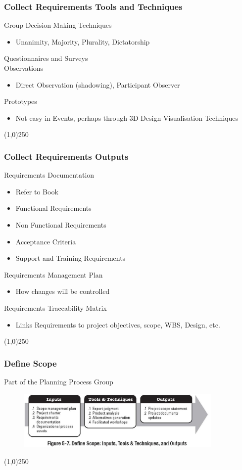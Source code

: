 \begin{frame}
\frametitle{Collect Requirements \hfill Tools and Techniques}
Group Decision Making Techniques
\begin{itemize}
	\item Unanimity, Majority, Plurality, Dictatorship
\end{itemize}
Questionnaires and Surveys\\
Observations
\begin{itemize}
	\item Direct Observation (shadowing), Participant Observer
\end{itemize}
Prototypes
\begin{itemize}
	\item Not easy in Events, perhaps through 3D Design Visualisation Techniques
\end{itemize}
\end{frame}\begin{center}\line(1,0){250}\end{center}



\begin{frame}
\frametitle{Collect Requirements \hfill Outputs}
Requirements Documentation
\begin{itemize}
	\item Refer to Book
	\item Functional Requirements
	\item Non Functional Requirements
	\item Acceptance Criteria
	\item Support and Training Requirements
\end{itemize}
Requirements Management Plan
\begin{itemize}
	\item How changes will be controlled
\end{itemize}
Requirements Traceability Matrix
\begin{itemize}
	\item Links Requirements to project objectives, scope, WBS, Design, etc.
\end{itemize}
\end{frame}\begin{center}\line(1,0){250}\end{center}



\begin{frame}
\frametitle{Define Scope}{Part of the Planning Process Group}
\begin{figure}
	\centering
		\includegraphics[width = 10cm]{images/Fig5-7.jpg}
	\label{fig:5-7}
\end{figure}
\end{frame}\begin{center}\line(1,0){250}\end{center}



